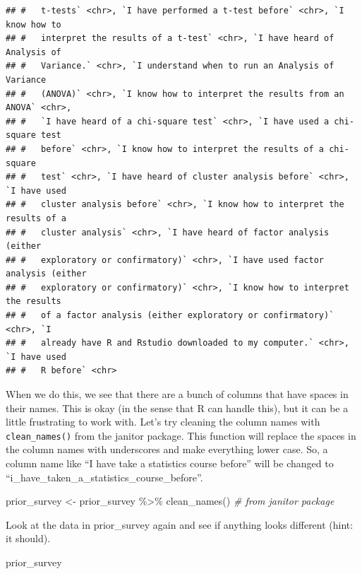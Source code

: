 \documentclass[
]{book}
\newenvironment{Shaded}{\begin{snugshade}}{\end{snugshade}}
\newcommand{\CommentTok}[1]{\textcolor[rgb]{0.56,0.35,0.01}{\textit{#1}}}
\newcommand{\FunctionTok}[1]{\textcolor[rgb]{0.00,0.00,0.00}{#1}}
\newcommand{\NormalTok}[1]{#1}
\newcommand{\OtherTok}[1]{\textcolor[rgb]{0.56,0.35,0.01}{#1}}
\newcommand{\SpecialCharTok}[1]{\textcolor[rgb]{0.00,0.00,0.00}{#1}}
\begin{document}
\begin{verbatim}
## #   t-tests` <chr>, `I have performed a t-test before` <chr>, `I know how to
## #   interpret the results of a t-test` <chr>, `I have heard of Analysis of
## #   Variance.` <chr>, `I understand when to run an Analysis of Variance
## #   (ANOVA)` <chr>, `I know how to interpret the results from an ANOVA` <chr>,
## #   `I have heard of a chi-square test` <chr>, `I have used a chi-square test
## #   before` <chr>, `I know how to interpret the results of a chi-square
## #   test` <chr>, `I have heard of cluster analysis before` <chr>, `I have used
## #   cluster analysis before` <chr>, `I know how to interpret the results of a
## #   cluster analysis` <chr>, `I have heard of factor analysis (either
## #   exploratory or confirmatory)` <chr>, `I have used factor analysis (either
## #   exploratory or confirmatory)` <chr>, `I know how to interpret the results
## #   of a factor analysis (either exploratory or confirmatory)` <chr>, `I
## #   already have R and Rstudio downloaded to my computer.` <chr>, `I have used
## #   R before` <chr>
\end{verbatim}

When we do this, we see that there are a bunch of columns that have spaces in their names. This is okay (in the sense that R can handle this), but it can be a little frustrating to work with. Let's try cleaning the column names with \texttt{clean\_names()} from the janitor package. This function will replace the spaces in the column names with underscores and make everything lower case. So, a column name like ``I have take a statistics course before'' will be changed to ``i\_have\_taken\_a\_statistics\_course\_before''.

\begin{Shaded}
\begin{Highlighting}[]
\NormalTok{prior\_survey }\OtherTok{\textless{}{-}}\NormalTok{ prior\_survey }\SpecialCharTok{\%\textgreater{}\%} \FunctionTok{clean\_names}\NormalTok{() }\CommentTok{\# from janitor package}
\end{Highlighting}
\end{Shaded}

Look at the data in prior\_survey again and see if anything looks different (hint: it should).

\begin{Shaded}
\begin{Highlighting}[]
\NormalTok{prior\_survey}
\end{Highlighting}
\end{Shaded}
\end{document}
